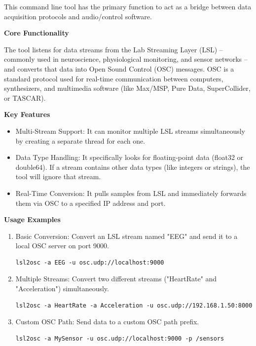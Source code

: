 This command line tool has the primary function to act as a bridge between data acquisition protocols and audio/control software.

{\bf Core Functionality}

The tool listens for data streams from the Lab Streaming Layer (LSL) -- commonly used in neuroscience, physiological monitoring, and sensor networks -- and converts that data into Open Sound Control (OSC) messages.
OSC is a standard protocol used for real-time communication between computers, synthesizers, and multimedia software (like Max/MSP, Pure Data, SuperCollider, or TASCAR).

{\bf Key Features}

\begin{itemize}
\item Multi-Stream Support: It can monitor multiple LSL streams
  simultaneously by creating a separate thread for each one.
\item Data Type Handling: It specifically looks for floating-point
  data (float32 or double64). If a stream contains other data types
  (like integers or strings), the tool will ignore that stream.
\item Real-Time Conversion: It pulls samples from LSL and immediately
  forwards them via OSC to a specified IP address and port.
\end{itemize}

{\bf Usage Examples}

\begin{enumerate}
\item Basic Conversion: Convert an LSL stream named "EEG" and send it
  to a local OSC server on port 9000.

\begin{verbatim}
lsl2osc -a EEG -u osc.udp://localhost:9000
\end{verbatim}

\item Multiple Streams: Convert two different streams ("HeartRate" and "Acceleration") simultaneously.

\begin{verbatim}
lsl2osc -a HeartRate -a Acceleration -u osc.udp://192.168.1.50:8000
\end{verbatim}

\item Custom OSC Path: Send data to a custom OSC path prefix.

\begin{verbatim}
lsl2osc -a MySensor -u osc.udp://localhost:9000 -p /sensors
\end{verbatim}
\end{enumerate}


